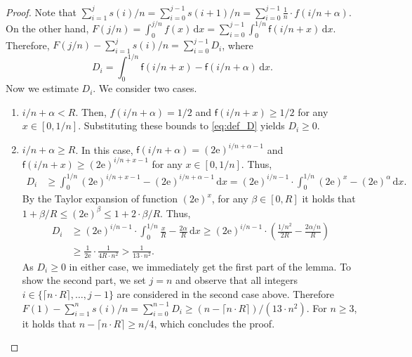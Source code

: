 \documentclass[a4paper,USenglish,cleveref]{lipics-v2019}
\newcommand{\e}{\mathrm{e}}
\newcommand{\R}{\ensuremath{R}}
\newcommand{\f}{\textsf{f}}
\newcommand{\dd}{\mathrm{d}}
\begin{document}
\begin{proof}
Note that $\sum_{i = 1}^j s(i)/n
= \sum_{i = 0}^{j-1} s(i+1) / n
 = \sum_{i = 0}^{j-1} \frac{1}{n} \cdot f(i/n+\alpha )$.
On the other hand, 
$F(j/n) = \int_0^{j/n} f(x) \,\dd x = \sum_{i = 0}^{j-1} \int_{0}^{1/n} \f(i/n + x) \,\dd x$.
Therefore, $F(j/n) - \sum_{i = 1}^j s(i)/n = \sum_{i=0}^{j-1} D_i$, where 
\begin{equation}
\label{eq:def_D}
  D_i = \int_{0}^{1/n} \f\left( i/n + x \right) 
      - \f\left( i/n + \alpha \right) \,\dd x .
\end{equation}
Now we estimate $D_i$. We consider two cases.
\begin{enumerate}
\item  $i/n + \alpha < \R$. Then, $f(i/n+\alpha) = 1/2$ and 
$\f(i/n+x) \geq 1/2$ for any $x \in [0,1/n]$. Substituting these bounds 
to \eqref{eq:def_D} yields $D_i \geq 0$. 

\item $i/n + \alpha \geq R$.
In this case, $\f(i/n + \alpha) = (2 \e)^{i/n + \alpha - 1}$ and 
$\f(i/n + x) \geq (2 \e)^{i/n + x - 1}$ for any $x \in [0,1/n]$.
Thus, 
\begin{align*}
    D_i 
      & \geq \int_{0}^{1/n} (2 \e)^{i/n + x - 1} - (2 \e)^{i/n + \alpha - 1} \,\dd x 
       = (2 \e)^{i/n - 1} \cdot 
        \int_{0}^{1/n} (2 \e)^x - (2 \e)^\alpha \,\dd x .
\end{align*}
%
By the Taylor expansion of function $(2\e)^x$,
for any $\beta \in [0,\R]$ it holds that
$1 + \beta/R \leq (2 \e)^\beta \leq 1 + 2 \cdot \beta/\R$. Thus, 
%
\begin{align*}
    D_i & \geq (2 \e)^{i/n - 1} \cdot 
        \int_{0}^{1/n} \frac{x}{\R} - \frac{2 \alpha}{\R} \,\dd x 
      \geq (2 \e)^{i/n - 1} \cdot \left( \frac{1/n^2}{2 \R} - \frac{2 \alpha / n}{\R} \right) \\
      & \geq \frac{1}{2 \e} \cdot \frac{1}{4 \R \cdot n^2} 
      > \frac{1}{13 \cdot n^2}.
\end{align*}
As $D_i \geq 0$ in either case, we immediately get the first part
of the lemma. 
To show the second part, we set $j = n$ and 
observe that all integers $i \in \{\lceil n \cdot \R \rceil, \ldots, j-1\}$ 
are considered in the second case above.
Therefore $F(1) - \sum_{i=1}^n s(i)/n = \sum_{i=0}^{n-1} D_i \geq 
(n-\lceil n \cdot R \rceil)/ (13 \cdot n^2)$. 
For $n \geq 3$, it holds that $n-\lceil n \cdot R \rceil \geq n/4$, which
concludes the proof.
\qedhere
\end{enumerate}
\end{proof}
\end{document}
